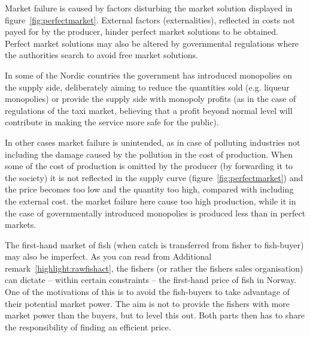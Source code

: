 \documentclass[11pt,fleqn]{book} %
\begin{document}
Market failure is caused by factors disturbing the market solution displayed in figure~\ref{fig:perfectmarket}. External factors (externalities), reflected in costs not payed for by the producer, hinder perfect market solutions to be obtained. Perfect market solutions may also be altered by governmental regulations where the authorities search to avoid free market solutions.

In some of the Nordic countries the government has introduced monopolies on the supply side, deliberately aiming to reduce the quantities sold (e.g. liqueur monopolies) or provide the supply side with monopoly profits (as in the case of regulations of the taxi market, believing that a profit beyond normal level will contribute in making the service more safe for the public).

In other cases market failure is unintended, as in case of polluting industries not including the damage caused by the pollution in the cost of production. When some of the cost of production is omitted by the producer (by forwarding it to the society) it is not reflected in the supply curve (figure~\ref{fig:perfectmarket}) and the price becomes too low and the quantity too high, compared with including the external cost. the market failure here cause too high production, while it in the case of governmentally introduced monopolies is produced less than in perfect markets.

The first-hand market of fish (when catch is transferred from fisher to fish-buyer) may also be imperfect. As you can read from Additional remark~\ref{highlight:rawfishact}, the fishers (or rather the fishers sales organisation) can dictate -- within certain constraints -- the first-hand price of fish in Norway. One of the motivations of this is to avoid the fish-buyers to take advantage of their potential market power. The aim is not to provide the fishers with more market power than the buyers, but to level this out. Both parts then has to share the responsibility of finding an efficient price.
\end{document}
